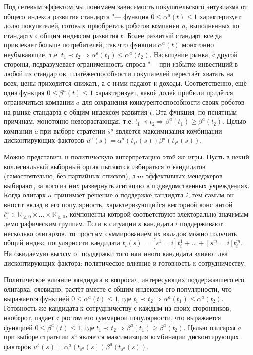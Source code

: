 Под сетевым эффектом мы понимаем зависимость покупательского энтузиазма от общего индекса развития стандарта "--- функция $0 \le \alpha^a(t) \le 1$ характеризует долю покупателей, готовых приобретать роботов компании $a$, выполненных по стандарту с общим индексом развития $t$. Более развитый стандарт всегда привлекает больше потребителей, так что функции $\alpha^a(t)$ монотонно неубывающие, т.е. $t_1 \prec t_2 \Rightarrow \alpha^a(t_1) \le \alpha^a(t_2)$. Насыщение рынка, с другой стороны, подразумевает ограниченность спроса "--- при избытке инвестиций в любой из стандартов, платёжеспособности покупателей перестаёт хватать на всех, цены приходится снижать, а с ними падают и доходы. Соответственно, ещё одна функция $0 \le \beta^a(t) \le 1$ характеризует, какой долей прибыли придётся ограничиться компании $a$ для сохранения конкурентоспособности своих роботов на рынке стандарта с общим индексом развития $t$. Эта функция, по понятным причинам, монотонно невозрастающая, т.е. $t_1 \prec t_2 \Rightarrow \beta^a(t_1) \ge \beta^a(t_2)$. Целью компании $a$ при выборе стратегии $s^a$ является максимизация комбинации дисконтирующих факторов $u^a(s) = \alpha^a(t_{s^a}(s)) \beta^a(t_{s^a}(s))$.

Можно представить и политическую интерпретацию этой же игры. Пусть в некий коллегиальный выборный орган пытаются избираться $n$ кандидатов (самостоятельно, без партийных списков), а $m$ эффективных менеджеров выбирают, за кого из них развернуть агитацию в подведомственных учреждениях. Когда олигарх $a$ принимает решение о поддержке кандидата $i$, тем самым он вносит вклад в его популярность, характеризующийся векторной константой $t_i^a \in \mathbb{R}_{\ge 0} \times \ldots \times \mathbb{R}_{\ge 0}$, компоненты которой соответствуют электорально значимым демографическим группам. Если в ситуации $s$ кандидата $i$ поддерживают несколько олигархов, то простым суммированием их вкладов можно получить общий индекс популярности кандидата $t_i(s) = [s^1 = i] t_i^1 + \ldots + [s^m = i] t_i^m$. На ожидаемую выгоду от поддержки того или иного кандидата влияют два дисконтирующих фактора: политическое влияние и готовность к сотрудничеству.

Политическое влияние кандидата в вопросах, интересующих поддержавшего его олигарха, очевидно, растёт вместе с общим индексом его популярности, что выражается функцией $0 \le \alpha^a(t) \le 1$, где $t_1 \prec t_2 \Rightarrow \alpha^a(t_1) \le \alpha^a(t_2)$. Готовность же кандидата к сотрудничеству с каждым из своих сторонников, наоборот, падает с ростом его суммарной популярности, что выражается функцией $0 \le \beta^a(t) \le 1$, где $t_1 \prec t_2 \Rightarrow \beta^a(t_1) \ge \beta^a(t_2)$. Целью олигарха $a$ при выборе стратегии $s^a$ является максимизация комбинации дисконтирующих факторов $u^a(s) = \alpha^a(t_{s^a}(s)) \beta^a(t_{s^a}(s))$.

